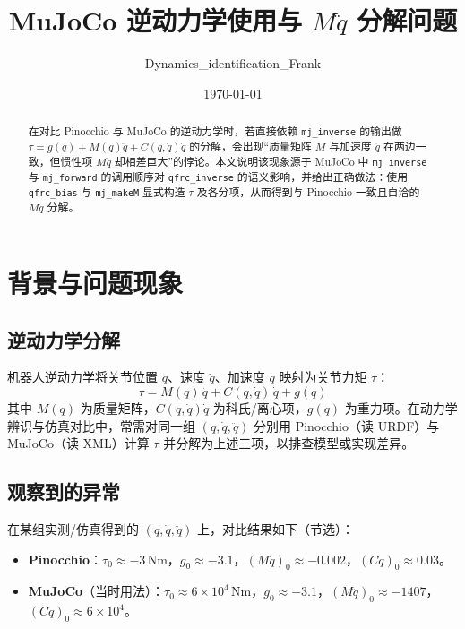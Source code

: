 \documentclass[12pt,a4paper]{article}
\title{MuJoCo 逆动力学使用与 $M\ddot{q}$ 分解问题}
\author{Dynamics\_identification\_Frank}
\date{\today}
\begin{document}
\maketitle

\begin{abstract}
在对比 Pinocchio 与 MuJoCo 的逆动力学时，若直接依赖 \texttt{mj\_inverse} 的输出做 $\tau = g(q) + M(q)\ddot{q} + C(q,\dot{q})\dot{q}$ 的分解，会出现“质量矩阵 $M$ 与加速度 $\ddot{q}$ 在两边一致，但惯性项 $M\ddot{q}$ 却相差巨大”的悖论。本文说明该现象源于 MuJoCo 中 \texttt{mj\_inverse} 与 \texttt{mj\_forward} 的调用顺序对 \texttt{qfrc\_inverse} 的语义影响，并给出正确做法：使用 \texttt{qfrc\_bias} 与 \texttt{mj\_makeM} 显式构造 $\tau$ 及各分项，从而得到与 Pinocchio 一致且自洽的 $M\ddot{q}$ 分解。
\end{abstract}

\tableofcontents
\newpage

\section{背景与问题现象}

\subsection{逆动力学分解}

机器人逆动力学将关节位置 $q$、速度 $\dot{q}$、加速度 $\ddot{q}$ 映射为关节力矩 $\tau$：
\begin{equation}
  \tau = M(q)\,\ddot{q} + C(q,\dot{q})\,\dot{q} + g(q)
  \label{eq:inverse-dyn}
\end{equation}
其中 $M(q)$ 为质量矩阵，$C(q,\dot{q})\dot{q}$ 为科氏/离心项，$g(q)$ 为重力项。在动力学辨识与仿真对比中，常需对同一组 $(q,\dot{q},\ddot{q})$ 分别用 Pinocchio（读 URDF）与 MuJoCo（读 XML）计算 $\tau$ 并分解为上述三项，以排查模型或实现差异。

\subsection{观察到的异常}

在某组实测/仿真得到的 $(q,\dot{q},\ddot{q})$ 上，对比结果如下（节选）：
\begin{itemize}[leftmargin=*]
  \item \textbf{Pinocchio}：$\tau_0 \approx -3\,\mathrm{Nm}$，$g_0 \approx -3.1$，$(M\ddot{q})_0 \approx -0.002$，$(C\dot{q})_0 \approx 0.03$。
  \item \textbf{MuJoCo}（当时用法）：$\tau_0 \approx 6\times 10^4\,\mathrm{Nm}$，$g_0 \approx -3.1$，$(M\ddot{q})_0 \approx -1407$，$(C\dot{q})_0 \approx 6\times 10^4$。
\end{itemize}
\end{document}
